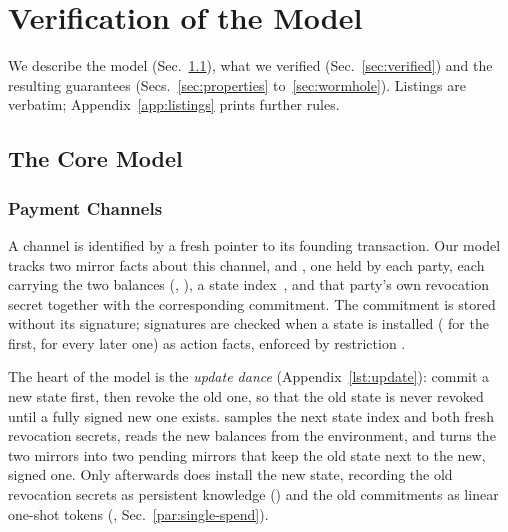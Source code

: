 \section{Verification of the Model}\label{sec:verification}

We describe the model (Sec.~\ref{sec:core}), what we verified (Sec.~\ref{sec:verified}) and the
resulting guarantees (Secs.~\ref{sec:properties} to~\ref{sec:wormhole}).
Listings are verbatim; Appendix~\ref{app:listings} prints further rules.

\subsection{The Core Model}\label{sec:core}

\subsubsection{Payment Channels}\label{sec:core-channels}
A channel is identified by a fresh pointer  to its founding transaction. Our model
tracks two mirror facts about this channel,  and , one held by each
party, each carrying the two balances (, ), a state index~, and that
party's own revocation secret together with the corresponding commitment. The commitment is
stored without its signature; signatures are checked when a state is installed
( for the first,  for every later one) as
 action facts, enforced by restriction .

The heart of the model is the \emph{update dance} (Appendix~\ref{lst:update}): commit a new
state first, then revoke the old one, so that the old state is never revoked until a fully
signed new one exists.  samples the next state index and both fresh
revocation secrets, reads the new balances from the environment, and turns the two mirrors into
two pending mirrors that keep the old state next to the new, signed one. Only afterwards does
 install the new state, recording the old revocation secrets as
persistent knowledge () and the old commitments as linear one-shot tokens
(, Sec.~\ref{par:single-spend}).

